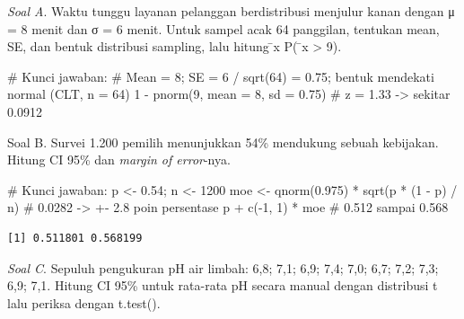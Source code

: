 \documentclass[
  indonesian,
  letterpaper,
]{book}
\newenvironment{Shaded}{\begin{snugshade}}{\end{snugshade}}
\newcommand{\CommentTok}[1]{\textcolor[rgb]{0.37,0.37,0.37}{#1}}
\newcommand{\DecValTok}[1]{\textcolor[rgb]{0.68,0.00,0.00}{#1}}
\newcommand{\FloatTok}[1]{\textcolor[rgb]{0.68,0.00,0.00}{#1}}
\newcommand{\FunctionTok}[1]{\textcolor[rgb]{0.28,0.35,0.67}{#1}}
\newcommand{\NormalTok}[1]{\textcolor[rgb]{0.00,0.23,0.31}{#1}}
\newcommand{\OtherTok}[1]{\textcolor[rgb]{0.00,0.23,0.31}{#1}}
\newcommand{\SpecialCharTok}[1]{\textcolor[rgb]{0.37,0.37,0.37}{#1}}
\begin{document}
\emph{Soal A}. Waktu tunggu layanan pelanggan berdistribusi menjulur
kanan dengan μ = 8 menit dan σ = 6 menit. Untuk sampel acak 64
panggilan, tentukan mean, SE, dan bentuk distribusi sampling, lalu
hitung ̄x P( ̄x \textgreater{} 9).

\begin{Shaded}
\begin{Highlighting}[]
\CommentTok{\# Kunci jawaban: }
\CommentTok{\# Mean = 8; SE = 6 / sqrt(64) = 0.75; bentuk mendekati normal (CLT, n = 64) 1 {-} pnorm(9, mean = 8, sd = 0.75)  \# z = 1.33 {-}\textgreater{} sekitar 0.0912 }
\end{Highlighting}
\end{Shaded}

Soal B. Survei 1.200 pemilih menunjukkan 54\% mendukung sebuah
kebijakan. Hitung CI 95\% dan \emph{margin of error}-nya.

\begin{Shaded}
\begin{Highlighting}[]
\CommentTok{\# Kunci jawaban:}
\NormalTok{p }\OtherTok{\textless{}{-}} \FloatTok{0.54}\NormalTok{; n }\OtherTok{\textless{}{-}} \DecValTok{1200}
\NormalTok{moe }\OtherTok{\textless{}{-}} \FunctionTok{qnorm}\NormalTok{(}\FloatTok{0.975}\NormalTok{) }\SpecialCharTok{*} \FunctionTok{sqrt}\NormalTok{(p }\SpecialCharTok{*}\NormalTok{ (}\DecValTok{1} \SpecialCharTok{{-}}\NormalTok{ p) }\SpecialCharTok{/}\NormalTok{ n) }\CommentTok{\# 0.0282 {-}\textgreater{} +{-} 2.8 poin persentase}
\NormalTok{p }\SpecialCharTok{+} \FunctionTok{c}\NormalTok{(}\SpecialCharTok{{-}}\DecValTok{1}\NormalTok{, }\DecValTok{1}\NormalTok{) }\SpecialCharTok{*}\NormalTok{ moe                          }\CommentTok{\# 0.512 sampai 0.568}
\end{Highlighting}
\end{Shaded}

\begin{verbatim}
[1] 0.511801 0.568199
\end{verbatim}

\emph{Soal C}. Sepuluh pengukuran pH air limbah: 6,8; 7,1; 6,9; 7,4;
7,0; 6,7; 7,2; 7,3; 6,9; 7,1. Hitung CI 95\% untuk rata-rata pH secara
manual dengan distribusi t lalu periksa dengan t.test().
\end{document}
